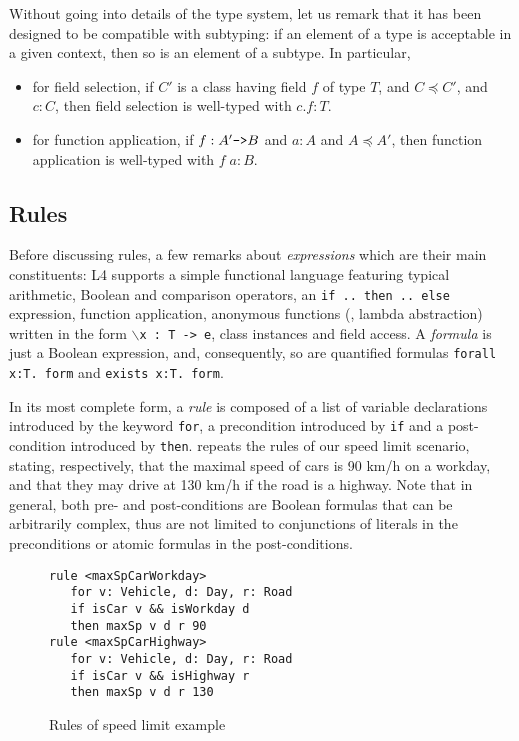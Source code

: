 Without going into details of the type system, let us remark that it has been
designed to be compatible with subtyping: if an element of a type is
acceptable in a given context, then so is an element of a subtype. In
particular,
\begin{itemize}
\item for field selection, if $C'$ is a class having field $f$ of type $T$,
  and $C \preceq C'$, and $c : C$, then field selection is well-typed with $c.f : T$.
\item for function application, if $f: A' \mbox{\texttt{->}} B$ and $a:A$ and
  $A \preceq A'$, then function application is well-typed with $f\; a : B$.
\end{itemize}


\subsection{Rules}\label{sec:rules}


Before discussing rules, a few remarks about \emph{expressions} which are
their main constituents: L4 supports a simple functional language featuring
typical arithmetic, Boolean and comparison operators, an \texttt{if .. then
  .. else} expression, function application, anonymous functions (\ie, lambda
abstraction) written in the form \texttt{$\backslash$x : T -> e}, class
instances and field access. A \emph{formula} is just a
Boolean expression, and, consequently, so are quantified formulas
\texttt{forall x:T. form} and \texttt{exists x:T. form}.

In its most complete form, a \emph{rule} is composed of a list of variable
declarations introduced by the keyword \texttt{for}, a precondition introduced
by \texttt{if} and a post-condition introduced by
\texttt{then}.  repeats the rules of our speed limit
scenario, stating, respectively, that the maximal speed of cars is 90 km/h on a
workday,
and that they may drive at 130 km/h if the road is a highway.  Note that in
general, both pre- and post-conditions are Boolean formulas that can be
arbitrarily complex, thus are not limited to conjunctions of literals in the
preconditions or atomic formulas in the post-conditions.

\begin{figure}[h!]
  \begin{lstlisting}
rule <maxSpCarWorkday> 
   for v: Vehicle, d: Day, r: Road
   if isCar v && isWorkday d
   then maxSp v d r 90
rule <maxSpCarHighway>
   for v: Vehicle, d: Day, r: Road
   if isCar v && isHighway r
   then maxSp v d r 130
\end{lstlisting}
  \caption{Rules of speed limit example}\label{fig:rules_app}
\end{figure}


